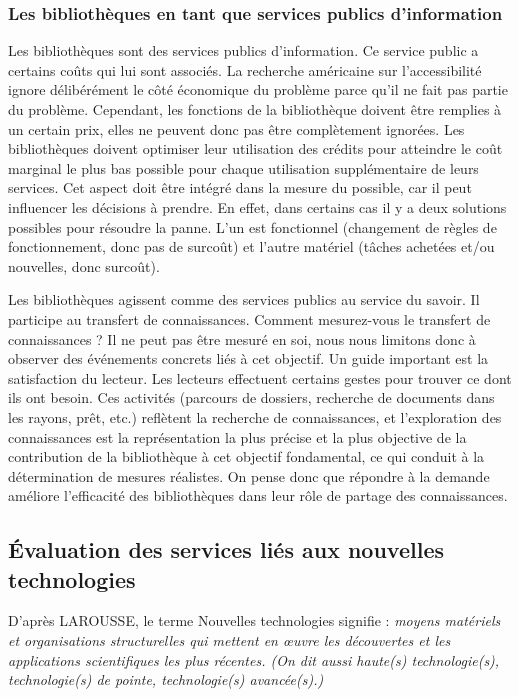 \documentclass[french,a4paper,12pt]{article}
\begin{document}
\subsubsection{Les bibliothèques en tant que services publics d'information} \citep{LapèlerieFrançois1994}

 \quad Les bibliothèques sont des services publics d'information. Ce service public a certains coûts qui lui sont associés. La recherche américaine sur l'accessibilité ignore délibérément le côté économique du problème parce qu'il ne fait pas partie du problème. Cependant, les fonctions de la bibliothèque doivent être remplies à un certain prix, elles ne peuvent donc pas être complètement ignorées. Les bibliothèques doivent optimiser leur utilisation des crédits pour atteindre le coût marginal le plus bas possible pour chaque utilisation supplémentaire de leurs services. Cet aspect doit être intégré dans la mesure du possible, car il peut influencer les décisions à prendre. En effet, dans certains cas il y a deux solutions possibles pour résoudre la panne. L'un est fonctionnel (changement de règles de fonctionnement, donc pas de surcoût) et l'autre matériel (tâches achetées et/ou nouvelles, donc surcoût).
 
 \quad \citep{LapèlerieFrançois1994} Les bibliothèques agissent comme des services publics au service du savoir. Il participe au transfert de connaissances. Comment mesurez-vous le transfert de connaissances ? Il ne peut pas être mesuré en soi, nous nous limitons donc à observer des événements concrets liés à cet objectif. Un guide important est la satisfaction du lecteur. Les lecteurs effectuent certains gestes pour trouver ce dont ils ont besoin. Ces activités (parcours de dossiers, recherche de documents dans les rayons, prêt, etc.) reflètent la recherche de connaissances, et l'exploration des connaissances est la représentation la plus précise et la plus objective de la contribution de la bibliothèque à cet objectif fondamental, ce qui conduit à la détermination de mesures réalistes. On pense donc que répondre à la demande améliore l'efficacité des bibliothèques dans leur rôle de partage des connaissances. 
 




\subsection{Évaluation des services liés aux nouvelles technologies}

\quad D'après LAROUSSE, le terme Nouvelles technologies signifie :\textit{ moyens matériels et organisations structurelles qui mettent en œuvre les découvertes et les applications scientifiques les plus récentes. (On dit aussi haute(s) technologie(s), technologie(s) de pointe, technologie(s) avancée(s).)}\\
\end{document}
